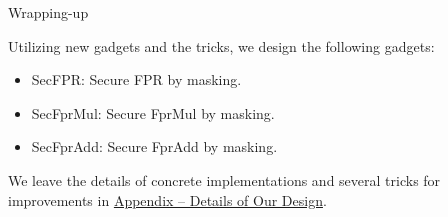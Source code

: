 \begin{frame}{Wrapping-up}

Utilizing new gadgets and the tricks, we design the following gadgets:
\pause
\begin{itemize}
	\item {\sf SecFPR}: Secure FPR by masking.
	\pause
	\item {\sf SecFprMul}: Secure FprMul by masking.
	\pause
	\item {\sf SecFprAdd}: Secure FprAdd by masking.
\end{itemize}
\pause
\medskip

We leave the details of concrete implementations and several tricks for improvements in \hyperlink{sec:appendix-gadgets-design}{\color{blue} Appendix – Details of Our Design}.

\end{frame}
